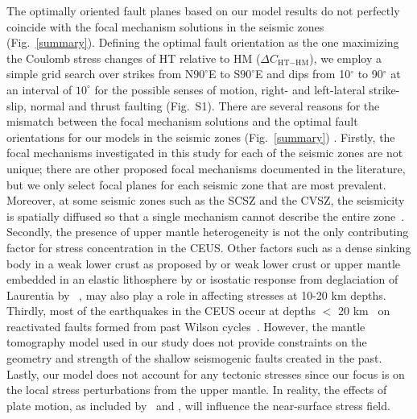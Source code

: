 \documentclass[draft,linenumbers]{agujournal2018}
\begin{document}
    
     The optimally oriented fault planes based on our model results do not perfectly coincide with the focal mechanism solutions in the seismic zones (Fig.~\ref{summary}). Defining the optimal fault orientation as the one maximizing the Coulomb stress changes of HT relative to HM ($\Delta C_{\text{HT}-\text{HM}}$), we employ a simple grid search over strikes from N$90^\circ$E to S$90^\circ$E and dips from 10$^\circ$ to 90$^\circ$ at an interval of $10^\circ$ for the possible senses of motion, right- and left-lateral strike-slip, normal and thrust faulting (Fig.~S1). There are several reasons for the mismatch between the focal mechanism solutions and the optimal fault orientations for our models in the seismic zones (Fig.~\ref{summary}) . Firstly, the focal mechanisms investigated in this study for each of the seismic zones are not unique; there are other proposed focal mechanisms documented in the literature, but we only select focal planes for each seismic zone that are most prevalent. Moreover, at some seismic zones such as the SCSZ and the CVSZ, the seismicity is spatially diffused so that a single mechanism cannot describe the entire zone~\citep{johnson2014earthquake, munsey1985focal, madabhushi1993fault}.  Secondly, the presence of upper mantle heterogeneity is not the only contributing factor for stress concentration in the CEUS. Other factors such as a dense sinking body in a weak lower crust as proposed by \citet{Pollitz_2001} or weak lower crust or upper mantle embedded in an elastic lithosphere by \citet{Kenner_2000a} or isostatic response from deglaciation of Laurentia by ~\citet{Grollimund_2001}, may also play a role in affecting stresses at 10-20 km depths. Thirdly, most of the earthquakes in the CEUS occur at depths $<$ 20 km~\citep[e.g.,][]{bollinger1985seismicity, chiu1992imaging, powell2016grenville} on reactivated faults formed from past Wilson cycles~\citep{thomas2006tectonic, wolin2012mineral}. However, the mantle tomography model used in our study does not provide constraints on the geometry and strength of the shallow seismogenic faults created in the past. Lastly, our model does not account for any tectonic stresses since our focus is on the local stress perturbations from the upper mantle. In reality, the effects of plate motion, as included by~\citet{zhan2016stress} and \citet{levandowski2016dense}, will influence the near-surface stress field.
\end{document}
